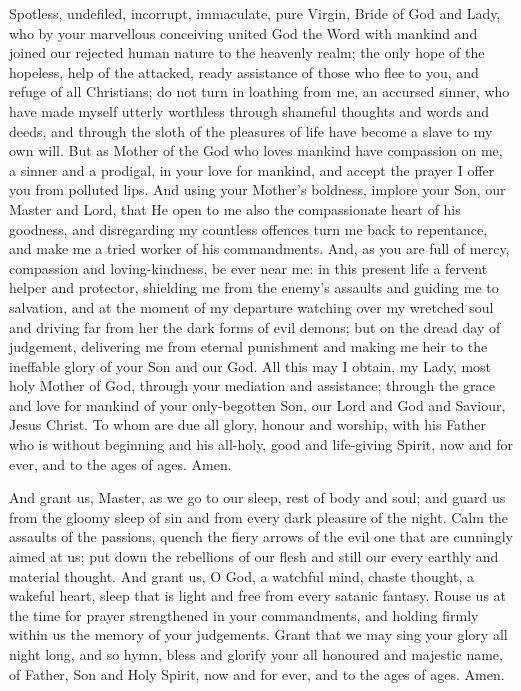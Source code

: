 Spotless, undefiled, incorrupt, immaculate, pure Virgin, Bride of God and Lady, who by your marvellous conceiving united God the Word with mankind and joined our rejected human nature to the heavenly realm; the only hope of the hopeless, help of the attacked, ready assistance of those who flee to you, and refuge of all Christians; do not turn in loathing from me, an accursed sinner, who have made myself utterly worthless through shameful thoughts and words and deeds, and through the sloth of the pleasures of life have become a slave to my own will. But as Mother of the God who loves mankind have compassion on me, a sinner and a prodigal, in your love for mankind, and accept the prayer I offer you from polluted lips. And using your Mother's boldness, implore your Son, our Master and Lord, that He open to me also the compassionate heart of his goodness, and disregarding my countless offences turn me back to repentance, and make me a tried worker of his commandments. And, as you are full of mercy, compassion and loving-kindness, be ever near me: in this present life a fervent helper and protector, shielding me from the enemy's assaults and guiding me to salvation, and at the moment of my departure watching over my wretched soul and driving far from her the dark forms of evil demons; but on the dread day of judgement, delivering me from eternal punishment and making me heir to the ineffable glory of your Son and our God. All this may I obtain, my Lady, most holy Mother of God, through your mediation and assistance; through the grace and love for mankind of your only-begotten Son, our Lord and God and Saviour, Jesus Christ. To whom are due all glory, honour and worship, with his Father who is without beginning and his all-holy, good and life-giving Spirit, now and for ever, and to the ages of ages. Amen.


And grant us, Master, as we go to our sleep, rest of body and soul; and guard us from the gloomy sleep of sin and from every dark pleasure of the night. Calm the assaults of the passions, quench the fiery arrows of the evil one that are cunningly aimed at us; put down the rebellions of our flesh and still our every earthly and material thought. And grant us, O God, a watchful mind, chaste thought, a wakeful heart, sleep that is light and free from every satanic fantasy. Rouse us at the time for prayer strengthened in your commandments, and holding firmly within us the memory of your judgements. Grant that we may sing your glory all night long, and so hymn, bless and glorify your all honoured and majestic name, of Father, Son and Holy Spirit, now and for ever, and to the ages of ages. Amen.


